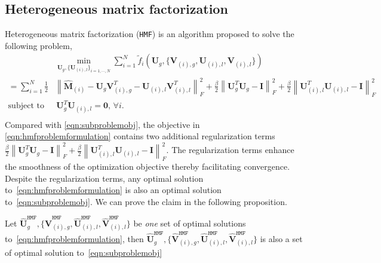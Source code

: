 \documentclass[twoside,11pt]{article}
\def\hmf{\texttt{HMF}\xspace}
\newcommand{\norm}[1]{\left\lVert#1\right\rVert}
\newcommand{\matI}{\mathbf{I}}
\newcommand{\matU}{\mathbf{U}}
\newcommand{\matV}{\mathbf{V}}
\newcommand{\hmatM}{\hat{\mathbf{M}}}
\newcommand{\hmatU}{\hat{\mathbf{U}}}
\newcommand{\hmatV}{\hat{\mathbf{V}}}
\newcommand{\tf}{\tilde{f}}
\begin{document}
\subsection{Heterogeneous matrix factorization}
\label{sec:hmfintro}
Heterogeneous matrix factorization (\hmf) \citep{hmf} is an algorithm proposed to solve the following problem,
\begin{equation}
\label{eqn:hmfproblemformulation}
\begin{aligned}
&\min_{\matU_g,\{\matU_{(i),l}\}_{i=1,\cdots,N}} \sum_{i=1}^N\tf_i\left(\matU_g,\{\matV_{(i),g},\matU_{(i),l},\matV_{(i),l}\}\right)\\
=\sum_{i=1}^N\frac{1}{2}&\norm{\hmatM_{(i)}-\matU_g\matV_{(i),g}^T-\matU_{(i),l}\matV_{(i),l}^T}_F^2+\frac{\beta}{2}\norm{\matU_g^T\matU_g-\matI}_F^2+\frac{\beta}{2}\norm{\matU_{(i),l}^T\matU_{(i),l}-\matI}_F^2\\
\text{subject to  }&  
\,  \matU_g^T\matU_{(i),l}=\bm{0},\, \forall i . \\
\end{aligned}
\end{equation}
Compared with \eqref{eqn:subproblemobj}, the objective in \eqref{eqn:hmfproblemformulation} contains two additional regularization terms $\frac{\beta}{2}\norm{\matU_g^T\matU_g-\matI}_F^2+\frac{\beta}{2}\norm{\matU_{(i),l}^T\matU_{(i),l}-\matI}_F^2$. The regularization terms enhance the smoothness of the optimization objective thereby facilitating convergence. Despite the regularization terms, any optimal solution to~\eqref{eqn:hmfproblemformulation} is also an optimal solution to~\eqref{eqn:subproblemobj}. We can prove the claim in the following proposition.
\begin{proposition}
Let $\hmatU_g^{\hmf},\{\hmatV^{\hmf}_{(i),g},\hmatU^{\hmf}_{(i),l},\hmatV^{\hmf}_{(i),l}\}$ be \textit{one} set of optimal solutions to~\eqref{eqn:hmfproblemformulation}, then $\hmatU_g^{\hmf},\{\hmatV^{\hmf}_{(i),g},\hmatU^{\hmf}_{(i),l},\hmatV^{\hmf}_{(i),l}\}$ is also a set of optimal solution to~\eqref{eqn:subproblemobj}
\end{proposition}
\end{document}
